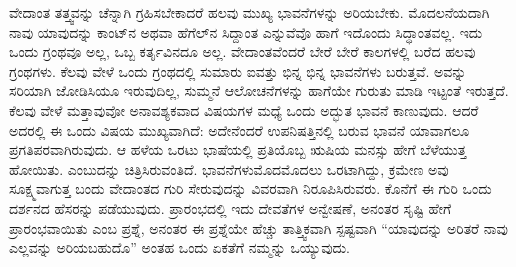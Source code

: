 ವೇದಾಂತ ತತ್ತ್ವವನ್ನು ಚೆನ್ನಾಗಿ ಗ್ರಹಿಸಬೇಕಾದರೆ ಹಲವು ಮುಖ್ಯ ಭಾವನೆಗಳನ್ನು ಅರಿಯಬೇಕು. ಮೊದಲನೆಯದಾಗಿ ನಾವು ಯಾವುದನ್ನು ಕಾಂಟ್‌ನ ಅಥವಾ ಹೆಗೆಲ್‌ನ ಸಿದ್ದಾಂತ ಎನ್ನುವೆವೊ ಹಾಗೆ ಇದೊಂದು ಸಿದ್ಧಾಂತವಲ್ಲ. ಇದು ಒಂದು ಗ್ರಂಥವೂ ಅಲ್ಲ, ಒಬ್ಬ ಕರ್ತೃವಿನದೂ ಅಲ್ಲ. ವೇದಾಂತವೆಂದರೆ ಬೇರೆ ಬೇರೆ ಕಾಲಗಳಲ್ಲಿ ಬರೆದ ಹಲವು ಗ್ರಂಥಗಳು. ಕೆಲವು ವೇಳೆ ಒಂದು ಗ್ರಂಥದಲ್ಲಿ ಸುಮಾರು ಐವತ್ತು ಭಿನ್ನ ಭಿನ್ನ ಭಾವನೆಗಳು ಬರುತ್ತವೆ. ಅವನ್ನು ಸರಿಯಾಗಿ ಜೋಡಿಸಿಯೂ ಇರುವುದಿಲ್ಲ, ಸುಮ್ಮನೆ ಆಲೋಚನೆಗಳನ್ನು ಹಾಗೆಯೇ ಗುರುತು ಮಾಡಿ ಇಟ್ಟಂತೆ ಇರುತ್ತದೆ. ಕೆಲವು ವೇಳೆ ಮತ್ತಾವುವೋ ಅನಾವಶ್ಯಕವಾದ ವಿಷಯಗಳ ಮಧ್ಯೆ ಒಂದು ಅದ್ಭುತ ಭಾವನೆ ಕಾಣುವುದು. ಆದರೆ ಅದರಲ್ಲಿ ಈ ಒಂದು ವಿಷಯ ಮುಖ್ಯವಾಗಿದೆ: ಅದೇನೆಂದರೆ ಉಪನಿಷತ್ತಿನಲ್ಲಿ ಬರುವ ಭಾವನೆ ಯಾವಾಗಲೂ ಪ್ರಗತಿಪರವಾಗಿರುವುದು. ಆ ಹಳೆಯ ಒರಟು ಭಾಷೆಯಲ್ಲಿ ಪ್ರತಿಯೊಬ್ಬ ಋಷಿಯ ಮನಸ್ಸು ಹೇಗೆ ಬೆಳೆಯುತ್ತ ಹೋಯಿತು. ಎಂಬುದನ್ನು ಚಿತ್ರಿಸಿರುವಂತಿದೆ. ಭಾವನೆಗಳು\break ಮೊದಮೊದಲು ಒರಟಾಗಿದ್ದು, ಕ್ರಮೇಣ ಅವು ಸೂಕ್ಷ್ಮವಾಗುತ್ತ ಬಂದು ವೇದಾಂತದ ಗುರಿ ಸೇರುವುದನ್ನು ವಿವರವಾಗಿ ನಿರೂಪಿಸಿರುವರು. ಕೊನೆಗೆ ಈ ಗುರಿ ಒಂದು ದರ್ಶನದ ಹೆಸರನ್ನು ಪಡೆಯುವುದು. ಪ್ರಾರಂಭದಲ್ಲಿ ಇದು ದೇವತೆಗಳ ಅನ್ವೇಷಣೆ, ಅನಂತರ ಸೃಷ್ಟಿ ಹೇಗೆ ಪ್ರಾರಂಭವಾಯಿತು ಎಂಬ ಪ್ರಶ್ನೆ, ಅನಂತರ ಈ ಪ್ರಶ್ನೆಯೇ ಹೆಚ್ಚು ತಾತ್ತ್ವಿಕವಾಗಿ ಸ್ಪಷ್ಟವಾಗಿ “ಯಾವುದನ್ನು ಅರಿತರೆ ನಾವು ಎಲ್ಲವನ್ನು ಅರಿಯಬಹುದೊ” ಅಂತಹ ಒಂದು ಏಕತೆಗೆ ನಮ್ಮನ್ನು ಒಯ್ಯುವುದು.

